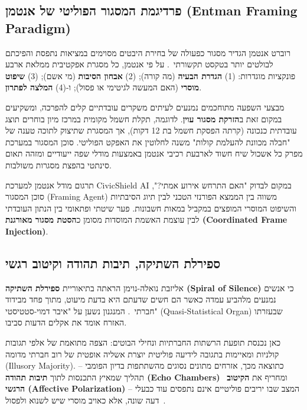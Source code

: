 \subsection{פרדיגמת המסגור הפוליטי של אנטמן (Entman Framing Paradigm)}
רוברט אנטמן הגדיר מסגור כפעולה של בחירת היבטים מסוימים במציאות נתפסת והפיכתם לבולטים יותר בטקסט תקשורתי~\cite{entman1993framing}. על פי אנטמן, כל מסגרת אפקטיבית ממלאת ארבע פונקציות מוגדרות: (1) \textbf{הגדרת הבעיה} (מה קורה); (2) \textbf{אבחון הסיבות} (מי אשם); (3) \textbf{שיפוט מוסרי} (האם המעשה לגיטימי או פסול); ו-(4) \textbf{המלצה לפתרון}.

מבצעי השפעה מתוחכמים נמנעים לעיתים משקרים עובדתיים קלים להפרכה, ומשקיעים במקום זאת ב\textbf{הזרקת מסגור עוין}. לדוגמה, תקלת חשמל מקומית במרכז מיון בוחרים תוצג עובדתית כנכונה (קרתה הפסקת חשמל בת 12 דקות), אך המסגרת שתיצוק לתוכה טענה של "חבלה מכוונת להעלמת קולות" משנה לחלוטין את האפקט הפוליטי. סוכן המסגור במערכת מפרק כל אשכול שיח חשוד לארבעת רכיבי אנטמן באמצעות מודלי שפה ייעודיים ומזהה תאום סינתטי בהפצת מסגרות משולבות.

\begin{infobox}{תרגום מודל אנטמן למערכת CivicShield AI}
במקום לבדוק "האם התרחש אירוע אמתי?", סוכן המסגור (Framing Agent) משווה בין הממצא הפורנזי הטכני לבין תיוג הסיבתיות והשיפוט המוסרי המופצים במקביל במאות חשבונות. פער שיטתי ופתאומי בין הנתון העובדתי לבין עוצמת האשמת המוסדות מסומן כ\textbf{הסטת מסגור מאורגנת (Coordinated Frame Injection)}.
\end{infobox}

\subsection{ספירלת השתיקה, תיבות תהודה וקיטוב רגשי}
אליזבת נואלה-נוימן הראתה בתיאוריית \textbf{ספירלת השתיקה (Spiral of Silence)} כי אנשים נמנעים מלהביע עמדה כאשר הם חשים שדעתם היא בדעת מיעוט, מתוך פחד מבידוד חברתי~\cite{noelle1974spiral}. המנגנון נשען על "איבר דמוי-סטטיסטי" (Quasi-Statistical Organ) שבעזרתו האזרח אומד את אקלים הדעות סביבו.

כאן נכנסת תופעת הרשתות החברתיות ונחילי הבוטים: הצפה מתואמת של אלפי תגובות קולניות ומאיימות בתגובה לידיעה פוליטית יוצרת אשליה אופטית של רוב חברתי מדומה (Illusory Majority). כתוצאה מכך, אזרחים מתונים נסוגים מהשתתפות בדיון הפומבי -- תהליך שמאיץ התכנסות לתוך \textbf{תיבות תהודה (Echo Chambers)}~\cite{sunstein2017republic} ומחריף את \textbf{הקיטוב הרגשי (Affective Polarization)} -- המצב שבו יריבים פוליטיים אינם נתפסים עוד כבעלי דעה שונה, אלא כאויב מוסרי שיש לשנוא ולפסול~\cite{iyengar2019affective}.

